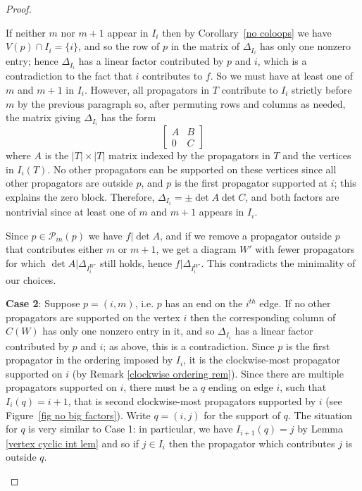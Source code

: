 \documentclass[11pt]{article}
\newcommand{\cP}{\mathcal{P}}
\theoremstyle{remark}
\theoremstyle{definition}
\begin{document}
\begin{proof}
\begin{enumerate}
If neither $m$ nor $m+1$ appear in $I_i$ then by Corollary~\ref{no coloops} we have $V(p) \cap I_i = \{i\}$, and so the row of $p$ in the matrix of $\Delta_{I_i}$ has only one nonzero entry; hence $\Delta_{I_i}$ has a linear factor contributed by $p$ and $i$, which is a contradiction to the fact that $i$ contributes to $f$.  So we must have at least one of $m$ and $m+1$ in $I_i$. However, all propagators in $T$ contribute to $I_{i}$ strictly before $m$ by the previous paragraph so, after permuting rows and columns as needed, the matrix giving $\Delta_{I_i}$ has the form
\[
\begin{bmatrix} A & B \\ 0 & C\end{bmatrix}
\]
where $A$ is the $|T|\times |T|$ matrix indexed by the propagators in $T$ and the vertices in $I_i(T)$. No other propagators can be supported on these vertices since all other propagators are outside $p$, and $p$ is the first propagator supported at $i$; this explains the zero block.  Therefore, $\Delta_{I_i} = \pm \det A \det C$, and both factors are nontrivial since at least one of $m$ and $m+1$ appears in $I_i$.  

Since $p\in \cP_{in}(p)$ we have $f|\det A$, and if we remove a propagator outside $p$ that contributes either $m$ or $m+1$, we get a diagram $W'$ with fewer propagators for which $\det A | \Delta_{I^{W'}_i}$ still holds, hence $f|\Delta_{I^{W'}_i}$.  This contradicts the minimality of our choices. 

\textbf{Case 2}: Suppose $p = (i, m)$, i.e. $p$ has an end on the $i^{th}$ edge. If no other propagators are supported on the vertex $i$ then the corresponding column of $C(W)$ has only one nonzero entry in it, and so $\Delta_{I_i}$ has a linear factor contributed by $p$ and $i$; as above, this is a contradiction.
Since $p$ is the first propagator in the ordering imposed by $I_i$, it is the clockwise-most propagator supported on $i$ (by Remark {\ref{clockwise ordering rem}}). Since there are multiple propagators supported on $i$, there must be a $q$ ending on edge $i$, such that $I_i(q) = i+1$, that is second clockwise-most propagators supported by $i$ (see Figure~\ref{fig no big factors}).
Write $q = (i, j)$ for the support of $q$.  The situation for $q$ is very similar to Case 1: in particular, we have $I_{i+1}(q) = j$ by Lemma {\ref{vertex cyclic int lem}} and so if $j\in I_i$ then the propagator which contributes $j$ is outside $q$.


\end{enumerate}
\end{proof}
\end{document}
